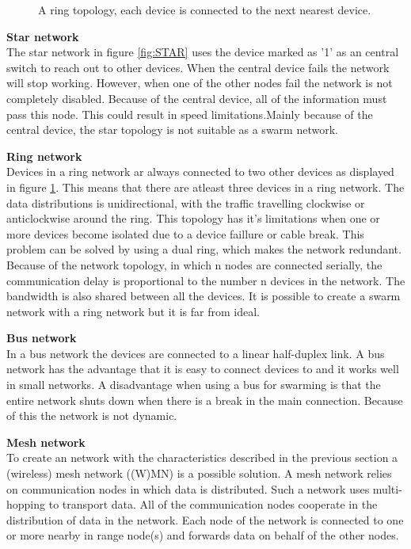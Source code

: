 \documentclass[10pt,a4paper]{article}
\begin{document}
\begin{figure}[H]
  \caption{A ring topology, each device is connected to the next nearest device.}\label{fig:RING}
\endminipage
\end{figure}

\textbf{Star network}\\
The star network in figure \ref{fig:STAR} uses the device marked as '1' as an central switch to reach out to other devices.\cite{starwiki} When the central device fails the network will stop working. However, when one of the other nodes fail the network is not completely disabled. Because of the central device, all of the information must pass this node. This could result in speed limitations.Mainly because of the central device, the star topology is not suitable as a swarm network. \cite{combook}

\textbf{Ring network}\\
Devices in a ring network ar always connected to two other devices as displayed in figure \ref{fig:RING}. This means that there are atleast three devices in a ring network. The data distributions is unidirectional, with the traffic travelling clockwise or anticlockwise around the ring. \cite{ringwiki} This topology has it's limitations when one or more devices become isolated due to a device faillure or cable break. This problem can be solved by using a dual ring, which makes the network redundant. Because of the network topology, in which n nodes are connected serially, the communication delay is proportional to the number n devices in the network. The bandwidth is also shared between all the devices. \cite{ringwiki} It is possible to create a swarm network with a ring network but it is far from ideal.

\textbf{Bus network}\\
In a bus network the devices are connected to a linear half-duplex link. \cite{bustopology} A bus network has the advantage that it is easy to connect devices to and it works well in small networks. A disadvantage when using a bus for swarming is that the entire network shuts down when there is a break in the main connection. 
Because of this the network is not dynamic.

\textbf{Mesh network}\\
To create an network with the characteristics described in the previous section a (wireless) mesh network ((W)MN) is a possible solution. A mesh network relies on communication nodes in which data is distributed. Such a network uses multi-hopping to transport data.\cite{multi-hopwirelessnetworks} All of the communication nodes cooperate in the distribution of data in the network. Each node of the network is connected to one or more nearby in range node(s) and forwards data on behalf of the other nodes. \cite{meshnetworking} \\
\end{document}

